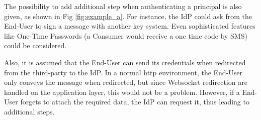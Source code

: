 The possibility to add additional step when authenticating a principal is also given, as shown in Fig \ref{fig:example_a}. For instance, the IdP could ask from the End-User to sign a message with another key system. Even sophisticated features like One-Time Passwords (a Consumer would receive a one time code by SMS) could be considered. 

Also, it is assumed that the End-User can send its credentials when redirected from the third-party to the IdP. In a normal http environment, the End-User only conveys the message when redirected, but since Websocket redirection are handled on the application layer, this would not be a problem. However, if a End-User forgets to attach the required data, the IdP can request it, thus leading to additional steps.


